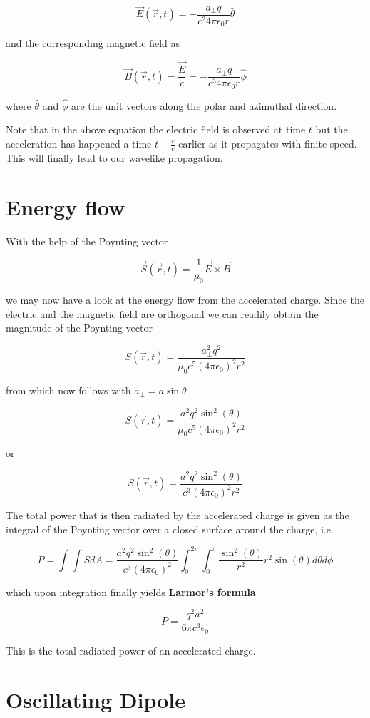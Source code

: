 \documentclass[
  a4paper,
]{book}
\begin{document}
\[
\vec{E}(\vec{r},t)=-\frac{a_{\perp}q}{c^2 4\pi \epsilon_0 r}\hat{\theta}
\]

and the corresponding magnetic field as

\[
\vec{B}(\vec{r},t)=\frac{\vec{E}}{c}=-\frac{a_{\perp}q}{c^3 4\pi \epsilon_0 r}\hat{\phi}
\]

where \(\hat{\theta}\) and \(\hat{\phi}\) are the unit vectors along the
polar and azimuthal direction.

Note that in the above equation the electric field is observed at time
\(t\) but the acceleration has happened a time \(t-\frac{r}{c}\) earlier
as it propagates with finite speed. This will finally lead to our
wavelike propagation.

\section{Energy flow}\label{energy-flow}

With the help of the Poynting vector

\[
\vec{S}(\vec{r},t)=\frac{1}{\mu_0} \vec{E} \times \vec{B}
\]

we may now have a look at the energy flow from the accelerated charge.
Since the electric and the magnetic field are orthogonal we can readily
obtain the magnitude of the Poynting vector

\[
S(\vec{r},t)=\frac{a_{\perp}^2 q^2}{\mu_0 c^5 (4\pi \epsilon_0)^2 r^2}
\]

from which now follows with \(a_{\perp}=a\sin{\theta}\)

\[
S(\vec{r},t)=\frac{a^2 q^2\sin^2(\theta)}{\mu_0 c^5 (4\pi \epsilon_0)^2 r^2}
\]

or

\[
S(\vec{r},t)=\frac{a^2 q^2\sin^2(\theta)}{c^3 (4\pi \epsilon_0)^2 r^2}
\]

The total power that is then radiated by the accelerated charge is given
as the integral of the Poynting vector over a closed surface around the
charge, i.e.

\[
P=\int\int S dA=\frac{a^2 q^2\sin^2(\theta)}{c^3 (4\pi \epsilon_0)^2}\int_0^{2\pi}\int_{0}^{\pi}\frac{\sin^2(\theta)}{r^2}r^2 \sin(\theta) d\theta d\phi
\]

which upon integration finally yields \textbf{Larmor's formula}

\[
P=\frac{q^2a^2}{6\pi c^3 \epsilon_0}
\]

This is the total radiated power of an accelerated charge.

\section{Oscillating Dipole}\label{oscillating-dipole}
\end{document}
